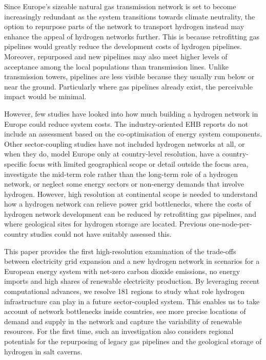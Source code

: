 Since Europe's sizeable natural gas transmission network is set to become
increasingly redundant as the system transitions towards climate neutrality, the
option to repurpose parts of the network to transport hydrogen instead may
enhance the appeal of hydrogen networks further. This is because retrofitting
gas pipelines would greatly reduce the development costs of hydrogen
pipelines.\cite{cerniauskasOptionsNatural2020,tsikliosHydrogenTransport2022}
Moreover, repurposed and new pipelines may also meet higher levels of acceptance
among the local populations than transmission
lines.\cite{schonauerHydrogenFuture2022} Unlike transmission towers, pipelines
are less visible because they usually run below or near the ground. Particularly
where gas pipelines already exist, the perceivable impact would be minimal.

However, few studies have looked into how much building a hydrogen network in
Europe could reduce system costs. The industry-oriented EHB reports do not
include an assessment based on the co-optimisation of energy system components.
\cite{gasforclimateEuropeanHydrogen2020,gasforclimateEuropeanHydrogen2021,gasforclimateExtendingEuropean2021,gasforclimateEuropeanHydrogen2022}
Other sector-coupling studies have not included hydrogen networks at all,
\cite{brownSynergiesSector2018,pickeringDiversityOptions2022,childFlexibleElectricity2019a,kendziorskiCentralizedDecentral2022a}
or when they do, model Europe only at country-level resolution,
\cite{europeancommission.directorategeneralforenergy.METISStudy2021,victoriaSpeedTechnological2022}
have a country-specific focus with limited geographical scope or detail outside
the focus area,\cite{gilsInteractionHydrogen2021} investigate the mid-term
role rather than the long-term role of a hydrogen
network,\cite{europeancommission.directorategeneralforenergy.METISStudy2021} or
neglect some energy sectors or non-energy demands that involve hydrogen.
\cite{gilsInteractionHydrogen2021,Caglayan2019,caglayanRobustDesign2021}
However, high resolution at continental scope is needed to understand how a
hydrogen network can relieve power grid bottlenecks, where the costs of hydrogen
network development can be reduced by retrofitting gas pipelines, and where
geological sites for hydrogen storage are located. Previous one-node-per-country
studies could not have suitably assessed this.

This paper provides the first high-resolution examination of the trade-offs
between electricity grid expansion and a new hydrogen network in scenarios for a
European energy system with net-zero carbon dioxide emissions, no energy imports
and high shares of renewable electricity production. By leveraging recent
computational advances, we resolve 181 regions to study what role hydrogen
infrastructure can play in a future sector-coupled system. This enables us to
take account of network bottlenecks inside countries, see more precise locations
of demand and supply in the network and capture the variability of renewable
resources. For the first time, such an investigation also considers regional
potentials for the repurposing of legacy gas pipelines and the geological
storage of hydrogen in salt caverns.

